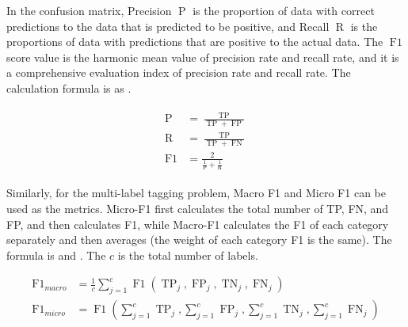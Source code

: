 
In the confusion matrix, Precision \(\operatorname{P}\) is the proportion of data with correct predictions to the data that is predicted to be positive, and Recall \(\operatorname{R}\) is the proportions of data with predictions that are positive to the actual data. The \(\operatorname{F1}\) score value is the harmonic mean value of precision rate and recall rate, and it is a comprehensive evaluation index of precision rate and recall rate. The calculation formula is as \eqname{\ref{fml:f1score}}.

\begin{align}\label{fml:f1score}
    \begin{split}
        \operatorname{P}          & =\frac{\operatorname{TP}}{\operatorname{TP}+\operatorname{FP}}    \\
        \operatorname{R}          & =\frac{\operatorname{TP}}{\operatorname{TP}+\operatorname{FN}}    \\
        \operatorname{F1} & = \frac{2}{\frac{1}{\operatorname{P}}+\frac{1}{\operatorname{R}}}
    \end{split}
\end{align}


Similarly, for the multi-label tagging problem, Macro F1 and Micro F1 can be used as the metrics. Micro-F1 first calculates the total number of TP, FN, and FP, and then calculates F1, while Macro-F1 calculates the F1 of each category separately and then averages (the weight of each category F1 is the same). The formula is \eqname{\ref{fml:f1-macro}} and \eqname{\ref{fml:f1-micro}}. The \(c\) is the total number of labels.

\begin{align}
    \operatorname{F1}_{macro} & =\frac{1}{c} \sum_{j=1}^{c} \operatorname{F1}(\operatorname{TP}_{j}, \operatorname{FP}_{j}, \operatorname{TN}_{j}, \operatorname{FN}_{j}) \label{fml:f1-macro}                                  \\
    \operatorname{F1}_{micro} & =\operatorname{F1}(\sum_{j=1}^{c} \operatorname{TP}_{j}, \sum_{j=1}^{c} \operatorname{FP}_{j}, \sum_{j=1}^{c} \operatorname{TN}_{j}, \sum_{j=1}^{c} \operatorname{FN}_{j}) \label{fml:f1-micro}
\end{align}

